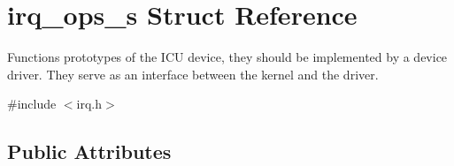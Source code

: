 \hypertarget{structirq__ops__s}{\section{irq\-\_\-ops\-\_\-s Struct Reference}
\label{structirq__ops__s}
}


Functions prototypes of the I\-C\-U device, they should be implemented by a device driver. They serve as an interface between the kernel and the driver.  




{\ttfamily \#include $<$irq.\-h$>$}

\subsection*{Public Attributes}
